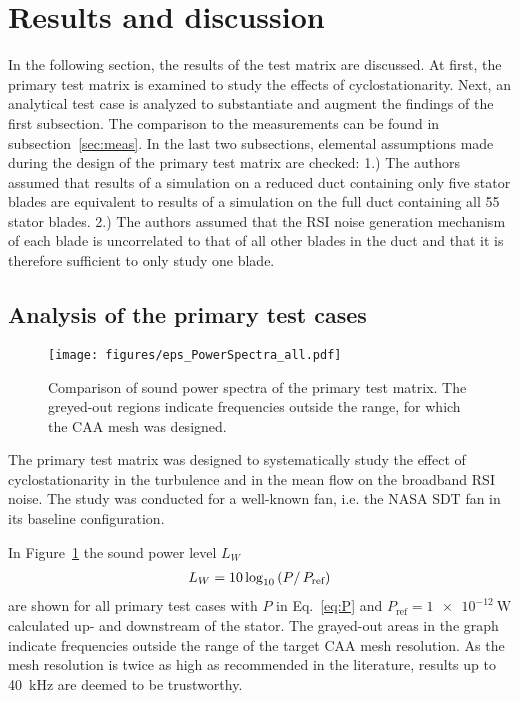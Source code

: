 
\section{Results and discussion}\label{sec:results}

In the following section, the results of the test matrix are discussed.  At first, the primary test matrix is examined to study the effects of cyclostationarity.  Next, an analytical test case is analyzed to substantiate and augment the findings of the first subsection.  The comparison to the measurements can be found in subsection~\ref{sec:meas}. In the last two subsections, elemental assumptions made during the design of the primary test matrix are checked: 1.) The authors assumed that results of a simulation on a reduced duct containing only five stator blades are equivalent to results of a simulation on the full duct containing all 55 stator blades. 2.)  The authors assumed that the RSI noise generation mechanism of each blade is uncorrelated to that of all other blades in the duct and that it is therefore sufficient to only study one blade.

\subsection{Analysis of the primary test cases}
\begin{figure}
\centering
\texttt{[image: figures/eps\_PowerSpectra\_all.pdf]} 
\caption{Comparison of sound power spectra of the primary test matrix. The greyed-out regions indicate frequencies outside the range, for which the CAA mesh was designed. \label{fig:PowerSpectra} }
\end{figure}

The primary test matrix was designed to systematically study the effect of cyclostationarity in the turbulence and in the mean flow on the broadband RSI noise.  The study was conducted for a well-known fan, i.e. the NASA SDT fan in its baseline configuration.

In Figure~\ref{fig:PowerSpectra} the sound power level  $L_W$ 
\begin{align}
L_W = 10 \log_{10}\left( P\right/P_\text{ref}) \label{eq:soundPowerLevel}
\end{align}
are shown for all primary test cases with $P$ in Eq.~\ref{eq:P} and $P_\text{ref} = \SI{1e-12}{\watt}$ calculated up- and downstream of the stator.  The grayed-out areas in the graph indicate frequencies outside the range of the target CAA mesh resolution. As the mesh resolution is twice as high as recommended in the literature, results up to \SI{40}{kHz} are deemed to be trustworthy.

